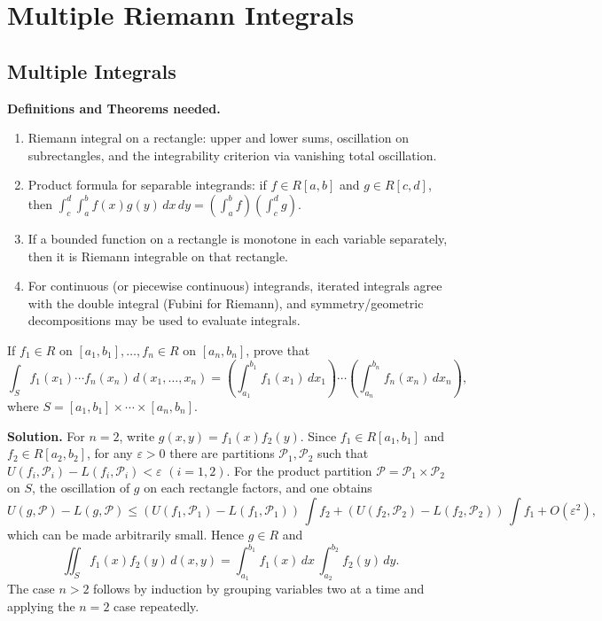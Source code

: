 \chapter{Multiple Riemann Integrals}
\section{Multiple Integrals}
\noindent\textbf{Definitions and Theorems needed.}
\begin{enumerate}[label=(\roman*)]
    \item Riemann integral on a rectangle: upper and lower sums, oscillation on subrectangles, and the integrability criterion via vanishing total oscillation.
    \item Product formula for separable integrands: if $f \in R[a,b]$ and $g \in R[c,d]$, then $\int_c^d \! \int_a^b f(x)g(y)\,dx\,dy = \left(\int_a^b f\right)\!\left(\int_c^d g\right)$.
    \item If a bounded function on a rectangle is monotone in each variable separately, then it is Riemann integrable on that rectangle.
    \item For continuous (or piecewise continuous) integrands, iterated integrals agree with the double integral (Fubini for Riemann), and symmetry/geometric decompositions may be used to evaluate integrals.
\end{enumerate}

\begin{problembox}
If \( f_1 \in R \) on \([a_1, b_1], \ldots, f_n \in R \) on \([a_n, b_n]\), prove that
\[ \int_{S} f_1(x_1) \cdots f_n(x_n) \, d(x_1, \ldots, x_n) = \left( \int_{a_1}^{b_1} f_1(x_1) \, dx_1 \right) \cdots \left( \int_{a_n}^{b_n} f_n(x_n) \, dx_n \right), \]
where \( S = [a_1, b_1] \times \cdots \times [a_n, b_n] \).
\end{problembox}

\noindent\textbf{Solution.}
For $n=2$, write $g(x,y)=f_1(x)f_2(y)$. Since $f_1\in R[a_1,b_1]$ and $f_2\in R[a_2,b_2]$, for any $\varepsilon>0$ there are partitions $\mathcal P_1,\mathcal P_2$ such that $U(f_i,\mathcal P_i)-L(f_i,\mathcal P_i)<\varepsilon$ $(i=1,2)$. For the product partition $\mathcal P=\mathcal P_1\times\mathcal P_2$ on $S$, the oscillation of $g$ on each rectangle factors, and one obtains
\[ U(g,\mathcal P)-L(g,\mathcal P) \le (U(f_1,\mathcal P_1)-L(f_1,\mathcal P_1))\,\int f_2 + (U(f_2,\mathcal P_2)-L(f_2,\mathcal P_2))\,\int f_1 + O(\varepsilon^2), \]
which can be made arbitrarily small. Hence $g\in R$ and
\[ \iint_S f_1(x)f_2(y)\,d(x,y) = \int_{a_1}^{b_1} f_1(x)\,dx\,\int_{a_2}^{b_2} f_2(y)\,dy. \]
The case $n>2$ follows by induction by grouping variables two at a time and applying the $n=2$ case repeatedly.

